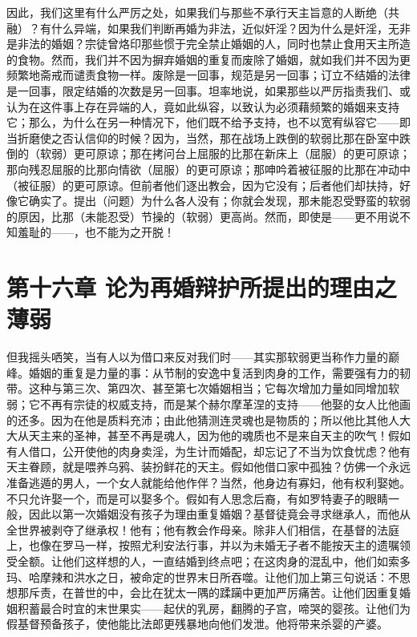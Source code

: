 因此，我们这里有什么严厉之处，如果我们与那些不承行天主旨意的人断绝（共融）？有什么异端，如果我们判断再婚为非法，近似奸淫？因为什么是奸淫，无非是非法的婚姻？宗徒曾烙印那些惯于完全禁止婚姻的人，同时也禁止食用天主所造的食物。然而，我们并不因为摒弃婚姻的重复而废除了婚姻，就如我们并不因为更频繁地斋戒而谴责食物一样。废除是一回事，规范是另一回事；订立不结婚的法律是一回事，限定结婚的次数是另一回事。坦率地说，如果那些以严厉指责我们、或认为在这件事上存在异端的人，竟如此纵容，以致认为必须藉频繁的婚姻来支持它；那么，为什么在另一种情况下，他们既不给予支持，也不以宽宥纵容它——即当折磨使之否认信仰的时候？因为，当然，那在战场上跌倒的软弱比那在卧室中跌倒的（软弱）更可原谅；那在拷问台上屈服的比那在新床上（屈服）的更可原谅；那向残忍屈服的比那向情欲（屈服）的更可原谅；那呻吟着被征服的比那在冲动中（被征服）的更可原谅。但前者他们逐出教会，因为它没有；后者他们却扶持，好像它确实了。提出（问题）为什么各人没有；你就会发现，那未能忍受野蛮的软弱的原因，比那（未能忍受）节操的（软弱）更高尚。然而，即使是——更不用说不知羞耻的——，也不能为之开脱！\par


\section{第十六章 论为再婚辩护所提出的理由之薄弱}

但我摇头哂笑，当有人以为借口来反对我们时——其实那软弱更当称作力量的巅峰。婚姻的重复是力量的事：从节制的安逸中复活到肉身的工作，需要强有力的韧带。这种与第三次、第四次、甚至第七次婚姻相当；它每次增加力量如同增加软弱；它不再有宗徒的权威支持，而是某个赫尔摩革涅的支持——他娶的女人比他画的还多。因为在他是质料充沛；由此他猜测连灵魂也是物质的；所以他比其他人大大从天主来的圣神，甚至不再是魂人，因为他的魂质也不是来自天主的吹气！假如有人借口，公开使他的肉身卖淫，为生计而婚配，却忘记了不当为饮食忧虑？他有天主眷顾，就是喂养乌鸦、装扮鲜花的天主。假如他借口家中孤独？仿佛一个永远准备逃遁的男人，一个女人就能给他作伴？当然，他身边有寡妇，他有权利娶她。不只允许娶一个，而是可以娶多个。假如有人思念后裔，有如罗特妻子的眼睛一般，因此以第一次婚姻没有孩子为理由重复婚姻？基督徒竟会寻求继承人，而他从全世界被剥夺了继承权！他有；他有教会作母亲。除非人们相信，在基督的法庭上，也像在罗马一样，按照尤利安法行事，并以为未婚无子者不能按天主的遗嘱领受全额。让他们这样想的人，一直结婚到终点吧；在这肉身的混乱中，他们如索多玛、哈摩辣和洪水之日，被命定的世界末日所吞噬。让他们加上第三句说话：不思想那斥责，在普世的中，会比在犹太一隅的蹂躏中更加严厉痛苦。让他们因重复婚姻积蓄最合时宜的末世果实——起伏的乳房，翻腾的子宫，啼哭的婴孩。让他们为假基督预备孩子，使他能比法郎更残暴地向他们发泄。他将带来杀婴的产婆。\par

